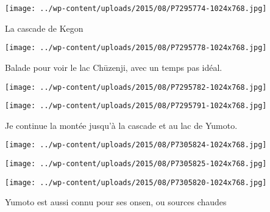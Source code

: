 \begin{center} \texttt{[image: ../wp-content/uploads/2015/08/P7295774-1024x768.jpg]} \end{center}

 

 La cascade de Kegon 

 

\begin{center} \texttt{[image: ../wp-content/uploads/2015/08/P7295778-1024x768.jpg]} \end{center}

 

 Balade pour voir le lac Chūzenji, avec un temps pas idéal. 

 

\begin{center} \texttt{[image: ../wp-content/uploads/2015/08/P7295782-1024x768.jpg]} \end{center}

 

 

\begin{center} \texttt{[image: ../wp-content/uploads/2015/08/P7295791-1024x768.jpg]} \end{center}

 

 Je continue la montée jusqu'à la cascade et au lac de Yumoto. 

 

\begin{center} \texttt{[image: ../wp-content/uploads/2015/08/P7305824-1024x768.jpg]} \end{center}

 

 

\begin{center} \texttt{[image: ../wp-content/uploads/2015/08/P7305825-1024x768.jpg]} \end{center}

 

 

\begin{center} \texttt{[image: ../wp-content/uploads/2015/08/P7305820-1024x768.jpg]} \end{center}

 

 Yumoto est aussi connu pour ses onsen, ou sources chaudes 

 

